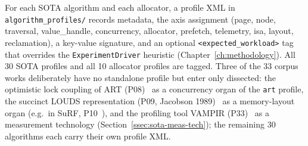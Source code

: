 For each SOTA algorithm and each allocator, a profile XML in \texttt{algorithm\_profiles/} records
metadata, the axis assignment (page, node, traversal, value\_handle, concurrency, allocator,
prefetch, telemetry, isa, layout, reclamation), a key-value signature, and an optional
\texttt{<expected\_workload>} tag that overrides the \texttt{ExperimentDriver} heuristic
(Chapter~\ref{ch:methodology}). All 30 SOTA profiles and all 10 allocator profiles are tagged. Three
of the 33 corpus works deliberately have no standalone profile but enter only dissected: the
optimistic lock coupling of ART (P08)~\cite{leis2016olc} as a concurrency organ of the \texttt{art}
profile, the succinct LOUDS representation (P09, Jacobson 1989)~\cite{jacobson1989louds} as a
memory-layout organ (e.g.\ in SuRF, P10~\cite{zhang2018surf}), and the profiling tool VAMPIR
(P33)~\cite{berthold2023vampir} as a measurement technology (Section~\ref{ssec:sota-meas-tech}); the
remaining 30 algorithms each carry their own profile XML\@.

